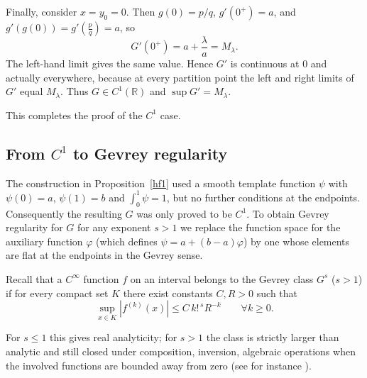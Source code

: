 \documentclass{amsart}
\newtheorem{Corollary}[Theorem]{Corollary}
\begin{document}
	Finally, consider $x=y_0=0$. Then $g(0)=p/q$, $g'(0^+)=a$, and $g'(g(0))=g'(\frac{p}{q})=a$, so
	\[
	G'(0^+)=a+\frac{\lambda}{a}=M_{\lambda}.
	\]
	The left-hand limit gives the same value. Hence $G'$ is continuous at $0$ and actually everywhere, because at every partition point the left and right limits of $G'$ equal $M_{\lambda}$. Thus $G\in C^1(\mathbb{R})$ and $\sup G' = M_{\lambda}$.
	
	This completes the proof of the $C^1$ case.
	
	
	\subsection{From \(C^1\) to Gevrey regularity}
	
	The construction in Proposition~\ref{hf1} used a smooth template function $\psi$ with $\psi(0)=a$, $\psi(1)=b$ and $\int_0^1\psi=1$, but no further conditions at the endpoints. Consequently the resulting $G$ was only proved to be $C^1$. To obtain Gevrey regularity for $G$ for any exponent $s>1$ we replace the function space for the auxiliary function $\varphi$ (which defines $\psi=a+(b-a)\varphi$) by one whose elements are flat at the endpoints in the Gevrey sense.
	
	Recall that a \(C^\infty\) function \(f\) on an interval belongs to the Gevrey class \(G^s\) (\(s>1\)) if for every compact set \(K\) there exist constants \(C,R>0\) such that
	\[
	\sup_{x\in K}|f^{(k)}(x)|\le C\, k!^{\,s}R^{-k}\qquad\forall k\ge0.
	\]
	
	For \(s\leq 1\) this gives real analyticity; for \(s>1\) the class is strictly larger than analytic and still closed under composition, inversion, algebraic operations when the involved functions are bounded away from zero (see for instance \cite[Appendix B]{BF}).
	
	
\end{document}
